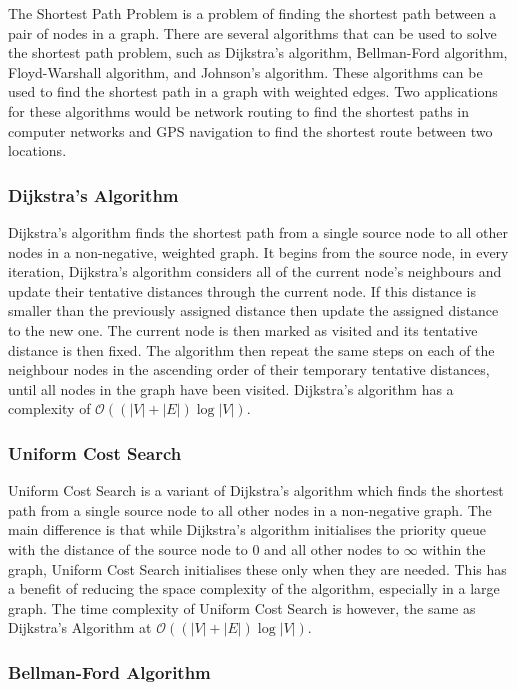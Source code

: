 The Shortest Path Problem is a problem of finding the shortest path between a pair of nodes in a graph. There are several algorithms that can be used to solve the shortest path problem, such as Dijkstra's algorithm, Bellman-Ford algorithm, Floyd-Warshall algorithm, and Johnson's algorithm. These algorithms can be used to find the shortest path in a graph with weighted edges. Two applications for these algorithms would be network routing to find the shortest paths in computer networks and GPS navigation to find the shortest route between two locations.

\subsubsection{Dijkstra's Algorithm}

Dijkstra's algorithm finds the shortest path from a single source node to all other nodes in a non-negative, weighted graph. It begins from the source node, in every iteration, Dijkstra's algorithm considers all of the current node's neighbours and update their tentative distances through the current node. If this distance is smaller than the previously assigned distance then update the assigned distance to the new one. The current node is then marked as visited and its tentative distance is then fixed. The algorithm then repeat the same steps on each of the neighbour nodes in the ascending order of their temporary tentative distances, until all nodes in the graph have been visited. Dijkstra's algorithm has a complexity of $\mathcal{O}((|V|+|E|)\log |V|)$.

\subsubsection{Uniform Cost Search}

Uniform Cost Search is a variant of Dijkstra's algorithm which finds the shortest path from a single source node to all other nodes in a non-negative graph. The main difference is that while Dijkstra's algorithm initialises the priority queue with the distance of the source node to $0$ and all other nodes to $\infty$ within the graph, Uniform Cost Search initialises these only when they are needed. This has a benefit of reducing the space complexity of the algorithm, especially in a large graph. The time complexity of Uniform Cost Search is however, the same as Dijkstra's Algorithm at $\mathcal{O}((|V|+|E|)\log |V|)$.

\subsubsection{Bellman-Ford Algorithm}


